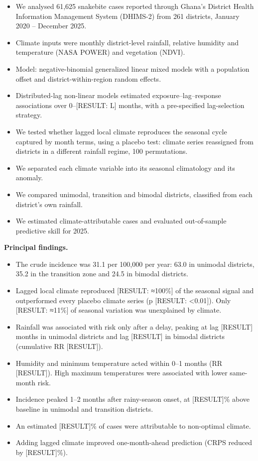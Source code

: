 \documentclass[11pt,a4paper]{article}
\providecommand{\tightlist}{\setlength{\itemsep}{0pt}\setlength{\parskip}{0pt}}
\begin{document}
\begin{itemize}
\tightlist
\item
  We analysed 61,625 snakebite cases reported through Ghana's District Health Information Management System (DHIMS-2) from 261 districts, January 2020 -- December 2025.
\item
  Climate inputs were monthly district-level rainfall, relative humidity and temperature (NASA POWER) and vegetation (NDVI).
\item
  Model: negative-binomial generalized linear mixed models with a population offset and district-within-region random effects.
\item
  Distributed-lag non-linear models estimated exposure--lag--response associations over 0--{[}RESULT: L{]} months, with a pre-specified lag-selection strategy.
\item
  We tested whether lagged local climate reproduces the seasonal cycle captured by month terms, using a placebo test: climate series reassigned from districts in a different rainfall regime, 100 permutations.
\item
  We separated each climate variable into its seasonal climatology and its anomaly.
\item
  We compared unimodal, transition and bimodal districts, classified from each district's own rainfall.
\item
  We estimated climate-attributable cases and evaluated out-of-sample predictive skill for 2025.
\end{itemize}

\textbf{Principal findings.}

\begin{itemize}
\tightlist
\item
  The crude incidence was 31.1 per 100,000 per year: 63.0 in unimodal districts, 35.2 in the transition zone and 24.5 in bimodal districts.
\item
  Lagged local climate reproduced {[}RESULT: ≈100\%{]} of the seasonal signal and outperformed every placebo climate series (p {[}RESULT: \textless0.01{]}). Only {[}RESULT: ≈11\%{]} of seasonal variation was unexplained by climate.
\item
  Rainfall was associated with risk only after a delay, peaking at lag {[}RESULT{]} months in unimodal districts and lag {[}RESULT{]} in bimodal districts (cumulative RR {[}RESULT{]}).
\item
  Humidity and minimum temperature acted within 0--1 months (RR {[}RESULT{]}). High maximum temperatures were associated with lower same-month risk.
\item
  Incidence peaked 1--2 months after rainy-season onset, at {[}RESULT{]}\% above baseline in unimodal and transition districts.
\item
  An estimated {[}RESULT{]}\% of cases were attributable to non-optimal climate.
\item
  Adding lagged climate improved one-month-ahead prediction (CRPS reduced by {[}RESULT{]}\%).
\end{itemize}
\end{document}
